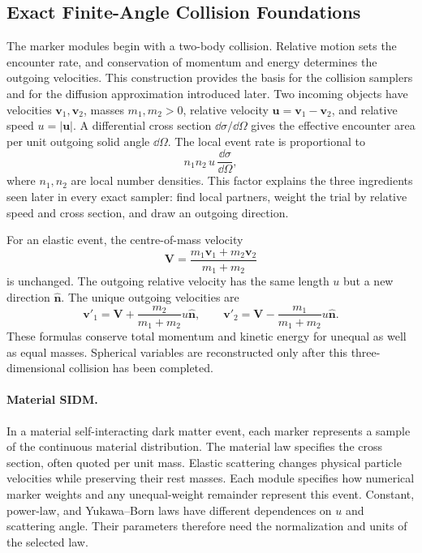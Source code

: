 \subsection{Exact Finite-Angle Collision Foundations}

The marker modules begin with a two-body collision. Relative motion sets
the encounter rate, and conservation of momentum and energy determines the
outgoing velocities. This construction provides the basis for the collision
samplers and for the diffusion approximation introduced later.  Two incoming objects have
velocities \(\bm v_1,\bm v_2\), masses \(m_1,m_2>0\), relative velocity
\(\bm u=\bm v_1-\bm v_2\), and relative speed \(u=|\bm u|\).  A differential
cross section \(\dd\sigma/\dd\Omega\) gives the effective encounter area per
unit outgoing solid angle \(\dd\Omega\).  The local event rate is proportional
to
\[
  n_1 n_2\,u\,\frac{\dd\sigma}{\dd\Omega},
\]
where \(n_1,n_2\) are local number densities.  This factor explains the three
ingredients seen later in every exact sampler: find local partners, weight the
trial by relative speed and cross section, and draw an outgoing direction.

For an elastic event, the centre-of-mass velocity
\[
 \bm V=\frac{m_1\bm v_1+m_2\bm v_2}{m_1+m_2}
\]
is unchanged.  The outgoing relative velocity has the same length \(u\) but a
new direction \(\widehat{\bm n}\).  The unique outgoing velocities are
\[
 \bm v'_1=\bm V+\frac{m_2}{m_1+m_2}u\widehat{\bm n},
 \qquad
 \bm v'_2=\bm V-\frac{m_1}{m_1+m_2}u\widehat{\bm n}.
\]
These formulas conserve total momentum and kinetic energy for unequal as well
as equal masses.  Spherical variables are reconstructed only after this
three-dimensional collision has been completed.

\paragraph{Material SIDM.}
In a material self-interacting dark matter event, each marker represents
a sample of the continuous material distribution. The material law specifies
the cross section, often quoted per unit mass. Elastic scattering changes physical particle velocities while preserving
their rest masses. Each module specifies how numerical marker weights and
any unequal-weight remainder represent this event. Constant, power-law, and
Yukawa--Born laws have different dependences on \(u\) and scattering angle.
Their parameters therefore need the normalization and units of the selected
law.

